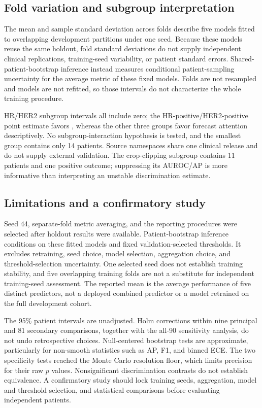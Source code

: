 \subsection{Fold variation and subgroup interpretation}
The mean and sample standard deviation across folds describe five models fitted to overlapping development partitions under one seed. Because these models reuse the same holdout, fold standard deviations do not supply independent clinical replications, training-seed variability, or patient standard errors. Shared-patient-bootstrap inference instead measures conditional patient-sampling uncertainty for the average metric of these fixed models. Folds are not resampled and models are not refitted, so those intervals do not characterize the whole training procedure.

HR/HER2 subgroup intervals all include zero; the HR-positive/HER2-positive point estimate favors \nojepa{}, whereas the other three groups favor forecast attention descriptively. No subgroup-interaction hypothesis is tested, and the smallest group contains only 14 patients. Source namespaces share one clinical release and do not supply external validation. The crop-clipping subgroup contains 11 patients and one positive outcome; suppressing its AUROC/AP is more informative than interpreting an unstable discrimination estimate.

\subsection{Limitations and a confirmatory study}
\label{sec:limitations}
Seed 44, separate-fold metric averaging, and the reporting procedures were selected after holdout results were available. Patient-bootstrap inference conditions on these fitted models and fixed validation-selected thresholds. It excludes retraining, seed choice, model selection, aggregation choice, and threshold-selection uncertainty. One selected seed does not establish training stability, and five overlapping training folds are not a substitute for independent training-seed assessment. The reported mean is the average performance of five distinct predictors, not a deployed combined predictor or a model retrained on the full development cohort.

The 95\% patient intervals are unadjusted. Holm corrections within nine principal and 81 secondary comparisons, together with the all-90 sensitivity analysis, do not undo retrospective choices. Null-centered bootstrap tests are approximate, particularly for non-smooth statistics such as AP, F1, and binned ECE. The two specificity tests reached the Monte Carlo resolution floor, which limits precision for their raw $p$ values. Nonsignificant discrimination contrasts do not establish equivalence. A confirmatory study should lock training seeds, aggregation, model and threshold selection, and statistical comparisons before evaluating independent patients.

